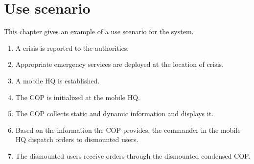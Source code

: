 \chapter{Use scenario}
\label{use_scenario}
This chapter gives an example of a use scenario for the system.

\begin{enumerate}
\item A crisis is reported to the authorities. 
\item Appropriate emergency services are deployed at the location of crisis.
\item A mobile HQ is established.
\item The COP is initialized at the mobile HQ.
\item The COP collects static and dynamic information and displays it.  
\item Based on the information the COP provides, the commander in the mobile HQ dispatch orders to dismounted users.
\item The dismounted users receive orders through the dismounted condensed COP. 

\end{enumerate}
